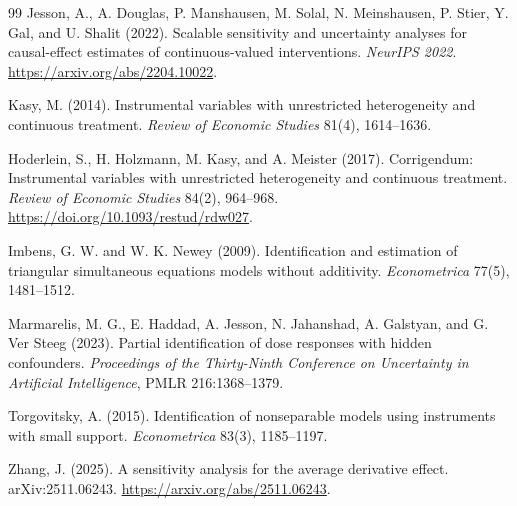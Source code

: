 \documentclass[11pt]{article}
\theoremstyle{definition}
\theoremstyle{plain}
\theoremstyle{remark}
\begin{document}
\begin{thebibliography}{99}
Jesson, A., A. Douglas, P. Manshausen, M. Solal, N. Meinshausen, P. Stier, Y. Gal, and U. Shalit (2022).
\newblock Scalable sensitivity and uncertainty analyses for causal-effect estimates of continuous-valued interventions.
\newblock \emph{NeurIPS 2022}. \url{https://arxiv.org/abs/2204.10022}.

Kasy, M. (2014).
\newblock Instrumental variables with unrestricted heterogeneity and continuous treatment.
\newblock \emph{Review of Economic Studies} 81(4), 1614--1636.

Hoderlein, S., H. Holzmann, M. Kasy, and A. Meister (2017).
\newblock Corrigendum: Instrumental variables with unrestricted heterogeneity and continuous treatment.
\newblock \emph{Review of Economic Studies} 84(2), 964--968. \url{https://doi.org/10.1093/restud/rdw027}.

Imbens, G. W. and W. K. Newey (2009).
\newblock Identification and estimation of triangular simultaneous equations models without additivity.
\newblock \emph{Econometrica} 77(5), 1481--1512.

Marmarelis, M. G., E. Haddad, A. Jesson, N. Jahanshad, A. Galstyan, and G. Ver Steeg (2023).
\newblock Partial identification of dose responses with hidden confounders.
\newblock \emph{Proceedings of the Thirty-Ninth Conference on Uncertainty in Artificial Intelligence}, PMLR 216:1368--1379.

Torgovitsky, A. (2015).
\newblock Identification of nonseparable models using instruments with small support.
\newblock \emph{Econometrica} 83(3), 1185--1197.

Zhang, J. (2025).
\newblock A sensitivity analysis for the average derivative effect.
\newblock arXiv:2511.06243. \url{https://arxiv.org/abs/2511.06243}.
\end{thebibliography}
\end{document}
